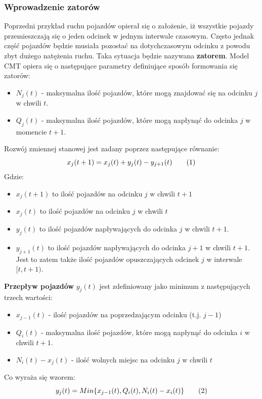 \documentclass[12pt]{book}
\theoremstyle{plain}
\newcommand\addtag{\refstepcounter{equation}
\renewcommand{\labelenumii}{\theenumii}
\renewcommand{\theenumii}{\theenumi.\arabic{enumii}.}
\tag{\theequation}}
\begin{document}
\subsubsection*{Wprowadzenie zatorów}
Poprzedni przykład ruchu pojazdów opierał się o założenie, iż wszystkie pojazdy przemieszczają się o jeden odcinek w jednym interwale czasowym. Często jednak część pojazdów będzie musiała pozostać na dotychczasowym odcinku z powodu zbyt dużego natężenia ruchu. Taka sytuacja będzie nazywana \textbf{zatorem}. Model CMT opiera się o następujące parametry definiujące sposób formowania się zatorów:
\begin{itemize}
	\item $N_j(t)$ - maksymalna ilość pojazdów, które mogą znajdować się na odcinku $j$ w chwili $t$.
	\item $Q_j(t)$ - maksymalna ilość pojazdów, które mogą napłynąć do odcinka $j$ w momencie $t+1$.
\end{itemize}
Rozwój zmiennej stanowej jest zadany poprzez następujące równanie:
\[x_j(t+1)=x_j(t)+y_j(t)-y_{j+1}(t) \addtag \]
Gdzie:
\begin{itemize}
	\item $x_j(t+1)$ to ilość pojazdów na odcinku $j$ w chwili $t+1$
	\item $x_j(t)$ to ilość pojazdów na odcinku $j$ w chwili $t$
	\item $y_j(t)$ to ilość pojazdów napływających do odcinka $j$ w chwili $t+1$.
	\item $y_{j+1}(t)$ to ilość pojazdów napływających do odcinka $j+1$ w chwili $t+1$. Jest to zatem także ilość pojazdów opuszczających odcinek $j$ w interwale $[t,t+1)$.
\end{itemize}
\textbf{Przepływ pojazdów} $y_j(t)$ jest zdefiniowany jako minimum z następujących trzech wartości:
\begin{itemize}
	\item $ x_{j-1}(t) $ - ilość pojazdów na poprzedzającym odcinku (t.j. $j-1$)
	\item $ Q_i(t) $ - maksymalna ilość pojazdów, które mogą napłynąć do odcinka $i$ w chwili $t+1$.
	\item $ N_i(t)-x_j(t) $ - ilość wolnych miejsc na odcinku $j$ w chwili $t$
\end{itemize}
Co wyraża się wzorem:
\[
y_j(t)=Min\{x_{j-1}(t),Q_i(t),N_i(t)-x_i(t)\} \addtag \label{eq_y_CTM}
\]
\end{document}
